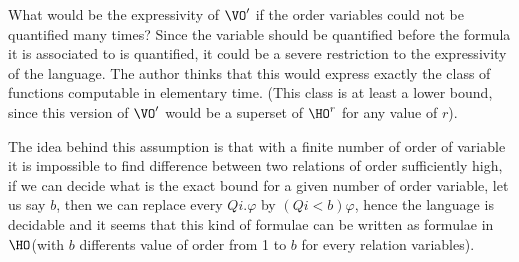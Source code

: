 \documentclass[a4paper,12pt]{article}
\theoremstyle{definition}
\renewcommand{\phi}{\varphi}
\newcommand{\hoa}[1]{\ensuremath{\HO^{#1}}}
\begin{document}
What would be the expressivity of $\VO'$ if the order variables could not be
quantified many times? Since the variable should be quantified before
the formula it is associated to is quantified, it could be a severe
restriction to the expressivity of the language. The author thinks
that this would express exactly the class of functions computable in
elementary time. (This class is at least a lower bound, since this
version of $\VO'$ would be a superset of $\hoa{r}$ for any value of
$r$).

The idea behind this assumption is that with a finite number of order
of variable it is impossible to find difference between two relations
of order sufficiently high, if we can decide what is the exact bound
for a given number of order variable, let us say $b$, then we can
replace every $Q i. \phi$ by $(Q i<b)\phi$, hence the language is
decidable and it seems that this kind of formulae can be written as
formulae in $\HO$(with $b$ differents value of order from 1 to $b$ for
every relation variables).


\end{document}
